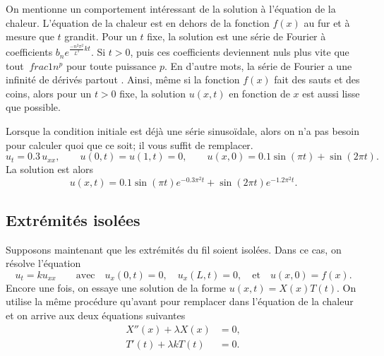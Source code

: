 On mentionne un comportement intéressant de la solution à l'équation de la chaleur.
L'équation de la chaleur est
 en dehors de la fonction $ f (x) $ au fur et à mesure que $ t $ grandit.  Pour un $ t $ fixe,
la solution est une série de Fourier à coefficients
$b_n e^{\frac{-n^2 \pi^2}{L^2} k t}$.  Si $t > 0$,  puis ces coefficients
deviennent nuls plus vite que tout $ \ frac {1} {n ^ p} $ pour toute puissance $ p $.  En d'autre
mots,  la série de Fourier a une infinité de dérivés partout .
Ainsi,  même si la fonction $ f (x) $ fait des sauts et des coins,  alors pour
un  $ t> 0 $ fixe,  la solution
$ u (x, t) $ en fonction de $ x $ est aussi lisse que possible.

\begin{example}
Lorsque la condition initiale est déjà une série sinusoïdale,  alors on n'a pas besoin
pour calculer quoi que ce soit; il vous suffit de remplacer.
\begin{equation*}
u_t = 0.3 \, u_{xx}, \qquad u(0,t)=u(1,t)=0, \qquad u(x,0) = 0.1 \sin(\pi t) +
\sin(2\pi t) .
\end{equation*}
La solution est alors
\begin{equation*}
u(x,t) =
0.1 \sin(\pi t) e^{- 0.3 \pi^2 t}
+ 
\sin(2 \pi t) e^{- 1.2 \pi^2 t} .
\end{equation*}
\end{example}

\subsection{Extrémités isolées}

Supposons maintenant que les extrémités du fil soient isolées.  Dans ce cas,  on résolve
l'équation
\begin{equation*}
u_t = k u_{xx}
\qquad \text{avec} \quad
u_x(0,t) = 0, \quad u_x(L,t) = 0,
\quad \text{et} \quad u(x,0) = f(x) .
\end{equation*}
Encore une fois,  on essaye une solution de la forme $ u (x, t) = X (x) T (t) $.  On utilise la même
procédure qu'avant pour remplacer dans l'équation de la chaleur et on arrive aux
deux équations suivantes
\begin{align*}
X''(x) + \lambda X(x) &= 0 , \\
T'(t) + \lambda k T(t) &= 0 .
\end{align*}

